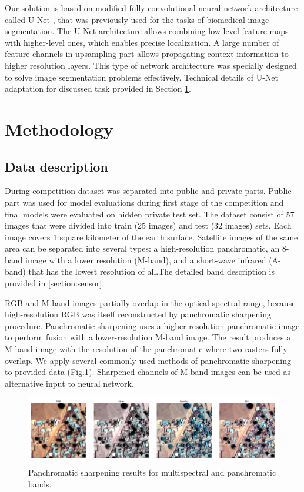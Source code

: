 \documentclass[10pt,twocolumn,letterpaper]{article}
\begin{document}
Our solution is based on modified fully convolutional neural network architecture called U-Net  \cite{unet}, that was previously used for the tasks of biomedical image segmentation. The U-Net architecture allows combining low-level feature maps with higher-level ones, which enables precise localization.  A large number of feature channels in upsampling part allows propagating context information to higher resolution layers.  This type of network architecture was specially designed to solve image segmentation problems effectively. Technical details of U-Net adaptation for discussed task provided in Section \ref{section:methods}.

\section{Methodology}
\label{section:methods}

\subsection{Data description}

During competition dataset was separated into public and private parts. Public part was used for model evaluations during first stage of the competition and final models were evaluated on hidden private test set.
The dataset consist of 57 images that were divided into train (25 images) and test (32 images) sets. Each image covers 1 square kilometer of the earth surface. Satellite images of the same area can be separated into several types: a high-resolution panchromatic, an 8-band image with a lower resolution (M-band), and a short-wave infrared (A-band) that has the lowest resolution of all.The detailed band description is provided in \ref{section:sensor}. 

RGB and M-band images partially overlap in the optical spectral range, because high-resolution RGB was itself reconstructed by panchromatic sharpening procedure. Panchromatic sharpening uses a higher-resolution panchromatic image to perform  fusion with a lower-resolution M-band image. The result produces a M-band image with the resolution of the panchromatic  where two rasters fully overlap. We apply several commonly used methods of panchromatic sharpening \cite{pansharp} to provided data (Fig.\ref{fig:pan}). Sharpened channels of M-band images can be used as alternative input to neural network.    

\begin{figure}[!h]
	\captionsetup{justification=centering}
	\centering
	\includegraphics[scale=0.225]{pansharpen}
	\caption{Panchromatic sharpening results for multispectral and panchromatic bands.}
	\label{fig:pan}
\end{figure}
\end{document}
